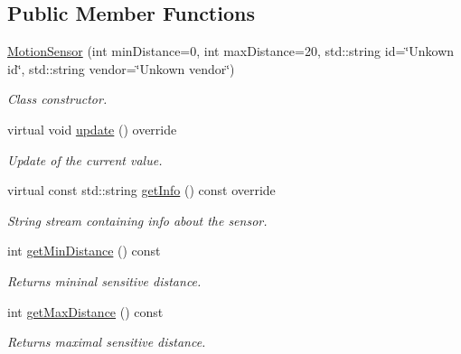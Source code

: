 \subsection*{Public Member Functions}
\begin{DoxyCompactItemize}
\item 
\hyperlink{classMotionSensor_a411baafe617c6e11c10aaa0e1ec6a9f4}{Motion\+Sensor} (int min\+Distance=0, int max\+Distance=20, std\+::string id=\char`\"{}Unkown id\char`\"{}, std\+::string vendor=\char`\"{}Unkown vendor\char`\"{})
\begin{DoxyCompactList}\small\item\em Class constructor. \end{DoxyCompactList}\item 
virtual void \hyperlink{classMotionSensor_a8e71f20dc63f45669377e6efc4d7c6df}{update} () override
\begin{DoxyCompactList}\small\item\em Update of the current value. \end{DoxyCompactList}\item 
virtual const std\+::string \hyperlink{classMotionSensor_a9b0a0233e5ccfb714cf5d10acfc0e188}{get\+Info} () const override\hypertarget{classMotionSensor_a9b0a0233e5ccfb714cf5d10acfc0e188}{}\label{classMotionSensor_a9b0a0233e5ccfb714cf5d10acfc0e188}

\begin{DoxyCompactList}\small\item\em String stream containing info about the sensor. \end{DoxyCompactList}\item 
int \hyperlink{classMotionSensor_aa19bf311e57fc21276d2eb74190cb709}{get\+Min\+Distance} () const \hypertarget{classMotionSensor_aa19bf311e57fc21276d2eb74190cb709}{}\label{classMotionSensor_aa19bf311e57fc21276d2eb74190cb709}

\begin{DoxyCompactList}\small\item\em Returns mininal sensitive distance. \end{DoxyCompactList}\item 
int \hyperlink{classMotionSensor_af095104075a3e5cb7c6c6466c8813f26}{get\+Max\+Distance} () const \hypertarget{classMotionSensor_af095104075a3e5cb7c6c6466c8813f26}{}\label{classMotionSensor_af095104075a3e5cb7c6c6466c8813f26}

\begin{DoxyCompactList}\small\item\em Returns maximal sensitive distance. \end{DoxyCompactList}\end{DoxyCompactItemize}
